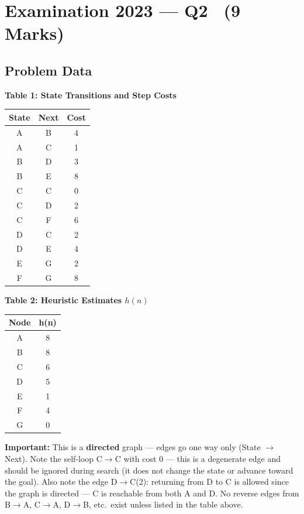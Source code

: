 \documentclass[12pt, a4paper]{article}
\newenvironment{notesbox}{\begin{mdframed}[style=notesframe]}{\end{mdframed}}
\begin{document}
\newpage
\section{Examination 2023 — Q2 \ (9 Marks)}

\subsection{Problem Data}

\begin{minipage}[t]{0.46\textwidth}
\centering
{\small\textbf{Table 1: State Transitions and Step Costs}}\\[0.4em]
\begin{tabular}{ccc}
\toprule
\textbf{State} & \textbf{Next} & \textbf{Cost} \\
\midrule
A & B & 4 \\
A & C & 1 \\
B & D & 3 \\
B & E & 8 \\
C & C & 0 \\
C & D & 2 \\
C & F & 6 \\
D & C & 2 \\
D & E & 4 \\
E & G & 2 \\
F & G & 8 \\
\bottomrule
\end{tabular}
\end{minipage}
\hfill
\begin{minipage}[t]{0.46\textwidth}
\centering
{\small\textbf{Table 2: Heuristic Estimates $h(n)$}}\\[0.4em]
\begin{tabular}{cc}
\toprule
\textbf{Node} & \textbf{h(n)} \\
\midrule
A & 8 \\
B & 8 \\
C & 6 \\
D & 5 \\
E & 1 \\
F & 4 \\
G & 0 \\
\bottomrule
\end{tabular}
\end{minipage}

\vspace{0.6em}
\begin{notesbox}
\textbf{Important:} This is a \textbf{directed} graph — edges go one way only (State $\to$ Next). Note the self-loop C$\to$C with cost 0 — this is a degenerate edge and should be ignored during search (it does not change the state or advance toward the goal). Also note the edge D$\to$C(2): returning from D to C is allowed since the graph is directed — C is reachable from both A and D. No reverse edges from B$\to$A, C$\to$A, D$\to$B, etc.\ exist unless listed in the table above.
\end{notesbox}
\end{document}
